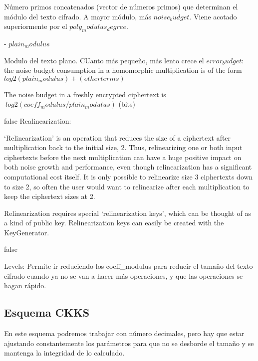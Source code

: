 Número primos concatenados (vector de números primos) que determinan el módulo del texto cifrado. A mayor módulo, más $noise_budget$. Viene acotado superiormente por el $poly_modulus_degree$.

- $plain_modulus$

Modulo del texto plano. CUanto más pequeño, más lento crece el $error_budget$: the noise budget consumption in a homomorphic multiplication is of the form $log2(plain_modulus) + (other terms)$

The noise budget in a freshly encrypted ciphertext is $~ log2(coeff_modulus/plain_modulus)$  (bits)


\if false
Realinearization:

`Relinearization' is an operation that reduces the size of a ciphertext after
    multiplication back to the initial size, 2. Thus, relinearizing one or both
    input ciphertexts before the next multiplication can have a huge positive
    impact on both noise growth and performance, even though relinearization has
    a significant computational cost itself. It is only possible to relinearize
    size 3 ciphertexts down to size 2, so often the user would want to relinearize
    after each multiplication to keep the ciphertext sizes at 2.

    Relinearization requires special `relinearization keys', which can be thought
    of as a kind of public key. Relinearization keys can easily be created with
    the KeyGenerator.

\fi

\if false

Levels: Permite ir reduciendo los coeff\_modulus para reducir el tamaño del texto cifrado cuando ya no se van a hacer más operaciones, y que las operaciones se hagan rápido.

\fi

\subsection{Esquema CKKS}


En este esquema podremos trabajar con número decimales, pero hay que estar ajustando constantemente los parámetros para que no se desborde el tamaño y se mantenga la integridad de lo calculado.

